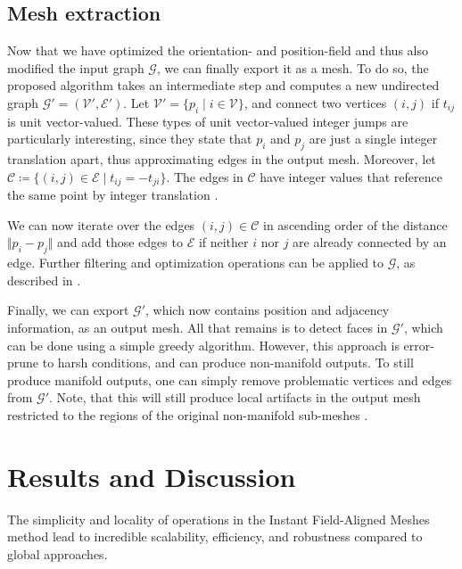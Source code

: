 \documentclass{ACGSeminar}
\begin{document}
\subsection{Mesh extraction}
Now that we have optimized the orientation- and position-field and thus also modified the input graph $\mathcal{G}$, we can finally export it as a mesh. To do so, the proposed algorithm takes an intermediate step and computes a new undirected graph $\mathcal{G}' = (\mathcal{V}', \mathcal{E}')$. Let $\mathcal{V}' = \{p_i \mid i \in \mathcal{V}\}$, and connect two vertices $(i,j)$ if $t_{ij}$ is unit vector-valued. These types of unit vector-valued integer jumps are particularly interesting, since they state that $p_i$ and $p_j$ are just a single integer translation apart, thus approximating edges in the output mesh. Moreover, let $\mathcal{C} \coloneqq \{(i,j) \in \mathcal{E} \mid t_{ij} = -t_{ji}\}$. The edges in $\mathcal{C}$ have integer values that reference the same point by integer translation \cite{jakob2015instant}.\bigskip

We can now iterate over the edges $(i,j) \in \mathcal{C}$ in ascending order of the distance $\Vert p_i - p_j \Vert$ and add those edges to $\mathcal{E}$ if neither $i$ nor $j$ are already connected by an edge. Further filtering and optimization operations can be applied to $\mathcal{G}$, as described in \cite{jakob2015instant}.

Finally, we can export $\mathcal{G}'$, which now contains position and adjacency information, as an output mesh. All that remains is to detect faces in $\mathcal{G}'$, which can be done using a simple greedy algorithm. However, this approach is error-prune to harsh conditions, and can produce non-manifold outputs. To still produce manifold outputs, one can simply remove problematic vertices and edges from $\mathcal{G}'$. Note, that this will still produce local artifacts in the output mesh restricted to the regions of the original non-manifold sub-meshes \cite{jakob2015instant}.

\section{Results and Discussion}
The simplicity and locality of operations in the Instant Field-Aligned Meshes method lead to incredible scalability, efficiency, and robustness compared to global approaches.
\end{document}
